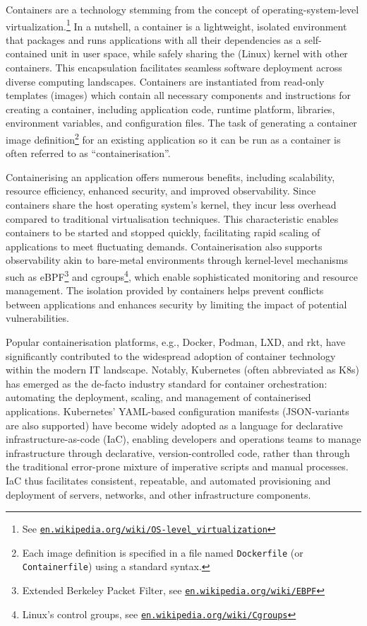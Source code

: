 \documentclass{easychair}
\begin{document}
Containers are a technology stemming from the concept of operating-system-level 
virtualization.\footnote{%
See \href{https://en.wikipedia.org/wiki/OS-level_virtualization}{\tt en.wikipedia.org/wiki/OS-level\_virtualization}}
In a nutshell, a container is a lightweight, isolated environment that packages and runs applications with all their dependencies as a self-contained unit in user space, while safely sharing the (Linux) kernel with other containers. This encapsulation facilitates seamless software deployment across diverse computing landscapes. 
Containers are instantiated from read-only templates (images) which contain all necessary components and instructions for creating a container, including application code, runtime platform, libraries, environment variables, and configuration files. The task of generating a container image definition\footnote{Each image definition is specified in a file named {\tt Dockerfile} (or {\tt Containerfile}) using a standard syntax.} for an existing application so it can be run as a container is often referred to as ``containerisation''.

Containerising an application offers numerous benefits, including scalability, resource efficiency, enhanced 
security, and improved observability. 
Since containers share the host operating system's kernel, they incur less overhead compared to 
traditional virtualisation techniques. 
This characteristic enables containers to be started and stopped quickly, facilitating rapid 
scaling of applications to meet fluctuating demands. 
Containerisation also supports observability akin to bare-metal environments through kernel-level 
mechanisms such as eBPF\footnote{%
Extended Berkeley Packet Filter, see \href{https://en.wikipedia.org/wiki/EBPF}{\tt en.wikipedia.org/wiki/EBPF}}
and cgroups\footnote{%
Linux's control groups, see \href{https://en.wikipedia.org/wiki/Cgroups}{\tt en.wikipedia.org/wiki/Cgroups}}, 
which enable sophisticated monitoring and resource management. 
The isolation provided by containers helps prevent conflicts between applications and enhances 
security by limiting the impact of potential vulnerabilities.

Popular containerisation platforms, e.g., Docker, Podman, LXD, and rkt, have significantly 
contributed to the widespread adoption of container technology within the modern IT landscape. 
Notably, Kubernetes (often abbreviated as K8s) has emerged as the de-facto industry standard for 
container orchestration: automating the deployment, scaling, and management of containerised 
applications. 
Kubernetes' YAML-based configuration manifests (JSON-variants are also supported) have become 
widely adopted as a language for  declarative infrastructure-as-code (IaC), enabling developers 
and operations teams to manage infrastructure through declarative, version-controlled code, 
rather than through the traditional error-prone mixture of imperative scripts and manual processes. 
IaC thus facilitates consistent, repeatable, and automated provisioning and deployment of servers, 
networks, and other infrastructure components.
\end{document}
